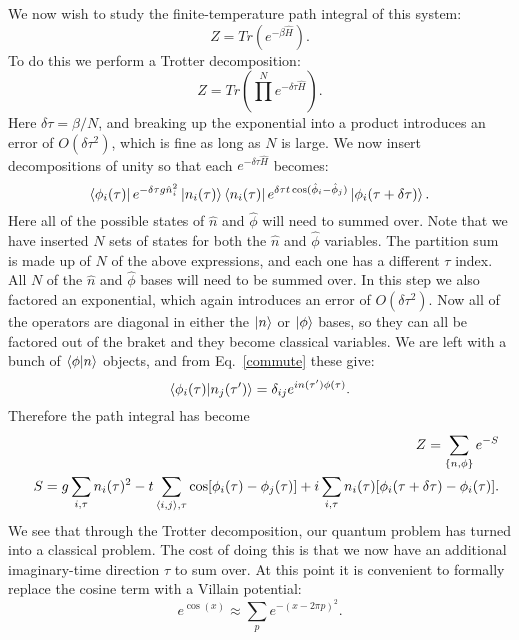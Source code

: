We now wish to study the finite-temperature path integral of this system:
\begin{equation}
Z=Tr(e^{-\beta \hat H}).
\end{equation}
To do this we perform a Trotter decomposition\cite{Trotter}:
\begin{equation}
Z=Tr(\prod^N e^{-\delta\tau \hat H}).
\end{equation}
Here $\delta\tau=\beta/N$, and breaking up the exponential into a product introduces an error of $O(\delta\tau^2)$, which is fine as long as $N$ is large. We now insert decompositions of unity so that each $e^{-\delta\tau\hat H}$ becomes:
\begin{equation}
\bra{\phi_i(\tau)} e^{-\delta\tau g \hat n_i^2} \ket{n_i(\tau)} \bra{n_i(\tau)} e^{\delta\tau t\cos(\hat\phi_i-\hat\phi_j)} \ket{\phi_i(\tau+\delta\tau)}.
\end{equation}
Here all of the possible states of $\hat n$ and $\hat\phi$ will need to summed over. Note that we have inserted $N$ sets of states for both the $\hat n$ and $\hat\phi$ variables. 
The partition sum is made up of $N$ of the above expressions, and each one has a different $\tau$ index. All $N$ of the $\hat n$ and $\hat \phi$ bases will need to be summed over.
In this step we also factored an exponential, which again introduces an error of $O(\delta\tau^2)$. Now all of the operators are diagonal in either the $\ket{n}$ or $\ket{\phi}$ bases, so they can all be factored out of the braket and they become classical variables. We are left with a bunch of $\braket{\phi|n}$ objects, and from Eq.~\ref{commute} these give:
\begin{equation}
\braket{\phi_i(\tau)|n_j(\tau^\prime)}=\delta_{ij}e^{i n(\tau^\prime)\phi(\tau)}.
\end{equation}
Therefore the path integral has become
\begin{eqnarray}
&&Z=\sum_{\{n,\phi\}}e^{-S}\nonumber\\
&&S=g\sum_{i,\tau} n_i(\tau)^2-t\sum_{\langle i,j\rangle,\tau} \cos[ \phi_i(\tau)-\phi_j(\tau)]+i\sum_{i,\tau} n_i(\tau)[\phi_i(\tau+\delta\tau)-\phi_i(\tau)].
\label{first_classical}
\end{eqnarray}
We see that through the Trotter decomposition, our quantum problem has turned into a classical problem. The cost of doing this is that we now have an additional imaginary-time direction $\tau$ to sum over. At this point it is convenient to formally replace the cosine term with a Villain potential:
\begin{equation}
e^{\cos(x)}\approx\sum_p e^{-(x-2\pi p)^2}.
\label{Villain}
\end{equation}
